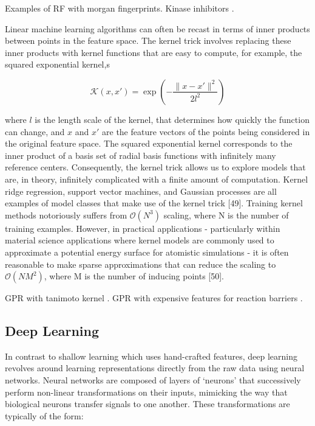 Examples of RF with morgan fingerprints. Kinase inhibitors \cite{Merget2017KinaseInhibitors}.

Linear machine learning algorithms can often be recast in terms of inner products between points in the feature space. The kernel trick involves replacing these inner products with kernel functions that are easy to compute, for example, the squared exponential kernel,s

\begin{equation}
    \mathcal{K}(x , x') = \exp\left(-\frac{\|x - x'\|^{2}}{2l^{2}}\right)
\end{equation}

where $l$ is the length scale of the kernel, that determines how quickly the function can change, and $x$ and $x'$ are the feature vectors of the points being considered in the original feature space. The squared exponential kernel corresponds to the inner product of a basis set of radial basis functions with infinitely many reference centers. Consequently, the kernel trick allows us to explore models that are, in theory, infinitely complicated with a finite amount of computation. Kernel ridge regression, support vector machines, and Gaussian processes are all examples of model classes that make use of the kernel trick [49]. Training kernel methods notoriously suffers from $\mathcal{O}(N^{3})$ scaling, where N is the number of training examples. However, in practical applications - particularly within material science applications where kernel models are commonly used to approximate a potential energy surface for atomistic simulations - it is often reasonable to make sparse approximations that can reduce the scaling to $\mathcal{O}(NM^{2})$, where M is the number of inducing points [50].

GPR with tanimoto kernel \cite{Griffiths2022photoswitches}. GPR with expensive features for reaction barriers \cite{Jorner2021ActiviationEnergiesGPR}.

\subsection{Deep Learning}

In contrast to shallow learning which uses hand-crafted features, deep learning revolves around learning representations directly from the raw data using neural networks. Neural networks are composed of layers of `neurons' that successively perform non-linear transformations on their inputs, mimicking the way that biological neurons transfer signals to one another. These transformations are typically of the form:

